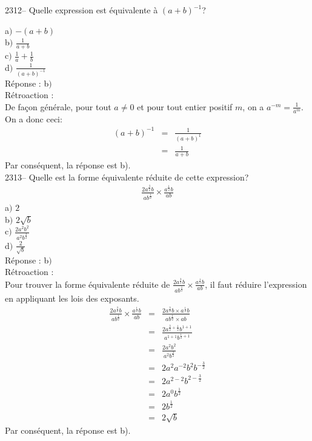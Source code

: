 \documentclass[letterpaper, 12pt]{article}
\begin{document}
2312-- Quelle expression est \'equivalente \`a $(a+b)^{-1}$?

a$)$  $-(a+b)$\\[2mm]
b$)$  $\frac{1}{a+b}$\\[2mm]
c$)$  $\frac{1}{a}+\frac{1}{b}$\\[2mm]
d$)$  $\frac{1}{(a+b)^{-1}} $\\

R\'eponse : b$)$ \\

R\'etroaction :\\
De fa\c con g\'en\'erale, pour tout $a \neq 0$ et pour tout entier positif $m$, on a $a^{-m}=\frac{1}{a^{m}}$. On a donc ceci:
\begin{eqnarray*}
(a+b)^{-1} &=& \frac{1}{(a+b)^{1}}\\
&=& \frac{1}{a+b}
\end{eqnarray*}
Par cons\'equent, la r\'eponse est b).\\


2313-- Quelle est la forme \'equivalente r\'eduite de cette expression?
\begin{eqnarray*}
 \frac{2a^{\frac{3}{2}}b}{ab^{\frac{1}{2}}}\times \frac{a^{\frac{1}{2}}b}{ab}
\end{eqnarray*}
a$)$  $2$\\[2mm]
b$)$  $2\sqrt{b}$\\[2mm]
c$)$  $\frac{2a^{2}b^{2}}{a^{2}b^{\frac{3}{2}}}$\\[2mm]
d$)$  $\frac{2}{\sqrt{b}}$\\[2mm]

R\'eponse : b$)$ \\

R\'etroaction :\\
Pour trouver la forme \'equivalente r\'eduite de $ \frac{2a^{\frac{3}{2}}b}{ab^{\frac{1}{2}}}\times \frac{a^{\frac{1}{2}}b}{ab}$, il faut r\'eduire l'expression en appliquant les lois des exposants.
\begin{eqnarray*}
  \frac{2a^{\frac{3}{2}}b}{ab^{\frac{1}{2}}}\times \frac{a^{\frac{1}{2}}b}{ab}&=&\frac{2a^{\frac{3}{2}}b\times a^{\frac{1}{2}}b}{ab^{\frac{1}{2}}\times ab}\\[2mm]
&=&\frac{2a^{\frac{3}{2}+\frac{1}{2}}b^{1+1}}{a^{1+1}b^{\frac{1}{2}+1}}\\[2mm]
&=&\frac{2a^{2}b^{2}}{a^{2}b^{\frac{3}{2}}}\\[2mm]
&=&2a^{2}a^{-2}b^{2}b^{-\frac{3}{2}}\\[2mm]
&=&2a^{2-2}b^{2-\frac{3}{2}}\\[2mm]
&=&2a^{0}b^{\frac{1}{2}}\\[2mm]
&=&2b^{\frac{1}{2}}\\[2mm]
&=&2\sqrt{b}
\end{eqnarray*}
Par cons\'equent, la r\'eponse est b).\\
\end{document}
